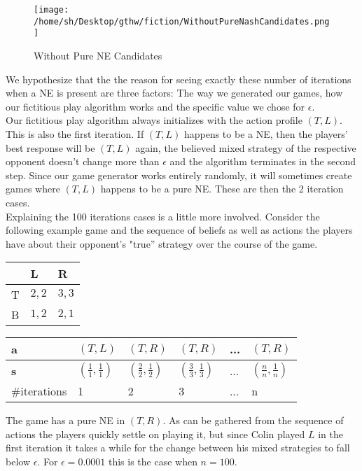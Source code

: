 \documentclass[10pt,a4paper]{article}
\begin{document}
\begin{figure}
  \texttt{[image: /home/sh/Desktop/gthw/fiction/WithoutPureNashCandidates.png]}
  \caption{Without Pure NE Candidates}
  \label{fig:boat1}
\end{figure}
We hypothesize that the the reason for seeing exactly these number of iterations when a NE is present are three factors: The way we generated our games, how our fictitious play algorithm works and the specific value we chose for $\epsilon$.\\
Our fictitious play algorithm always initializes with the action profile $(T,L)$. This is also the first iteration. If $(T,L)$ happens to be a NE, then the players' best response will be $(T,L)$ again, the believed mixed strategy of the respective opponent doesn't change more than $\epsilon$ and the algorithm terminates in the second step. Since our game generator works entirely randomly, it will sometimes create games where $(T,L)$ happens to be a pure NE. These are then the 2 iteration cases.\\
Explaining the 100 iterations cases is a little more involved. Consider the following example game and the sequence of beliefs as well as actions the players have about their opponent's "true'' strategy over the course of the game.
\begin{table}[h]
\centering
\begin{tabular}{|l|l|l|}
\hline
  & L                & R                \\ \hline
T & $2,2$ & $3,3$   \\ \hline
B & $1,2$ & $2,1$ \\ \hline
\end{tabular}
\end{table}
\begin{table}[h]
\centering
\begin{tabular}{|l|l|l|l|l|l|}
\hline
\textbf{a} & $(T,L)$ & $(T,R)$ & $(T,R)$ & ... & $(T,R)$           \\ \hline
\textbf{s} & $(\tfrac{1}{1},\tfrac{1}{1})$   & $(\tfrac{2}{2},\tfrac{1}{2})$  & $(\tfrac{3}{3},\tfrac{1}{3})$ & ... & $(\tfrac{n}{n},\tfrac{1}{n})$ \\ \hline
\#iterations & 1       & 2 &  3  & ... & n      \\ \hline
\end{tabular}
\end{table}
The game has a pure NE in $(T,R)$. As can be gathered from the sequence of actions the players quickly settle on playing it, but since Colin played $L$ in the first iteration it takes a while for the change between his mixed strategies to fall below $\epsilon$. For $\epsilon=0.0001$ this is the case when $n=100$.
\end{document}
